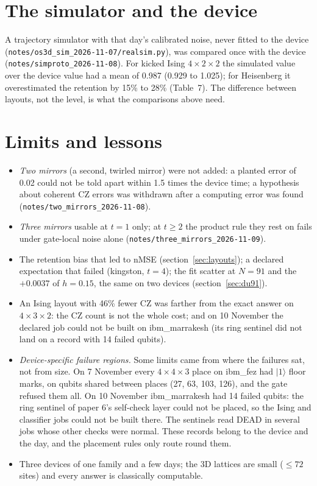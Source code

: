 \documentclass[10pt,a4paper]{article}
\begin{document}
\section{The simulator and the device}\label{sec:sim}
A trajectory simulator with that day's calibrated noise, never fitted to the device
(\texttt{notes/os3d\_sim\_2026-11-07/realsim.py}), was compared once with the device
(\texttt{notes/simproto\_2026-11-08}). For kicked Ising $4\times2\times2$ the simulated value over the device value
had a mean of 0.987 (0.929 to 1.025); for Heisenberg it overestimated the retention by 15\% to 28\% (Table~7). The
difference between layouts, not the level, is what the comparisons above need.

\section{Limits and lessons}\label{sec:limits}
\begin{itemize}
\item \emph{Two mirrors} (a second, twirled mirror) were not added: a planted error of 0.02 could not be told apart
within 1.5 times the device time; a hypothesis about coherent CZ errors was withdrawn after a computing error was
found (\texttt{notes/two\_mirrors\_2026-11-08}).
\item \emph{Three mirrors} usable at $t = 1$ only; at $t \ge 2$ the product rule they rest on fails under gate-local
noise alone (\texttt{notes/three\_mirrors\_2026-11-09}).
\item The retention bias that led to nMSE (section~\ref{sec:layouts}); a declared expectation that failed (kingston,
$t = 4$); the fit scatter at $N = 91$ and the $+0.0037$ of $h = 0.15$, the same on two devices (section~\ref{sec:du91}).
\item An Ising layout with 46\% fewer CZ was farther from the exact answer on $4\times3\times2$: the CZ count is
not the whole cost; and on 10 November the declared job could not be built on ibm\_marrakesh (its ring sentinel did
not land on a record with 14 failed qubits).
\item \emph{Device-specific failure regions.} Some limits came from where the failures sat, not from size. On 7
November every $4\times4\times3$ place on ibm\_fez had $|1\rangle$ floor marks, on qubits shared between places (27, 63, 103, 126), and the
gate refused them all. On 10 November ibm\_marrakesh had 14 failed qubits: the ring sentinel of paper 6's self-check
layer could not be placed, so the Ising and classifier jobs could not be built there. The
sentinels read DEAD in several jobs whose other checks were normal. These records belong to the device and the day, and
the placement rules only route round them.
\item Three devices of one family and a few days; the 3D lattices are small ($\le 72$ sites) and every answer is
classically computable.
\end{itemize}
\end{document}
